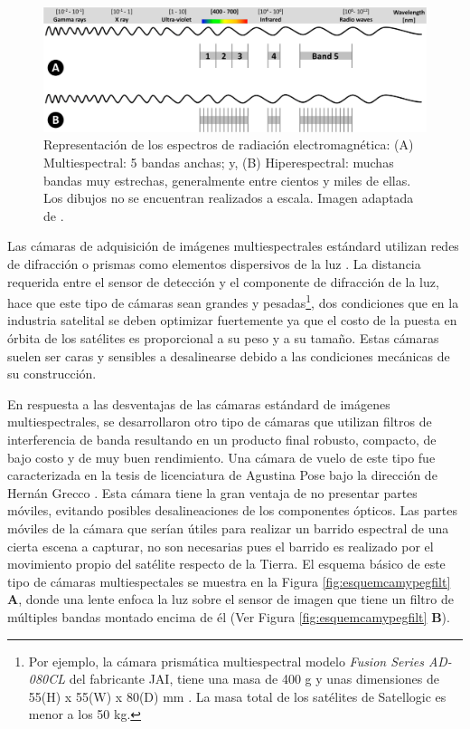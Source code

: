 \begin{figure}[H]
	\centering
	\includegraphics[scale=0.2]{Figs/introduccion/multivshyper.png}
	\caption{ Representación de los espectros de radiación electromagnética: (A) Multiespectral: 5 
		bandas anchas; y, (B) Hiperespectral: muchas bandas muy estrechas, 
		generalmente entre cientos y miles de ellas. Los dibujos no se 
		encuentran 
		realizados a escala. Imagen adaptada de \cite{Adao2017}.}
	\label{fig:spectrus}
\end{figure}


Las cámaras de adquisición de imágenes multiespectrales estándard utilizan 
redes de difracción o prismas como elementos dispersivos de la luz \cite{5459162}. La 
distancia requerida entre el sensor de detección y el componente de difracción 
de la luz, hace que este tipo de cámaras sean grandes y pesadas\footnote{Por ejemplo, la cámara prismática multiespectral modelo \textit{Fusion Series AD-080CL} del fabricante JAI, tiene una masa de 400 g y unas dimensiones de 55(H) x 55(W) x 80(D) mm \cite{jaii}. La masa total de los satélites de Satellogic es menor a los 50 kg.}, dos condiciones que en la industria satelital se deben optimizar 
fuertemente ya que el costo de la puesta en órbita de los satélites es 
proporcional a su peso y a su tamaño. Estas cámaras suelen ser caras y 
sensibles a desalinearse debido a las condiciones mecánicas de su construcción. 

En respuesta a las desventajas de las cámaras estándard de imágenes multiespectrales, se desarrollaron otro tipo de cámaras que utilizan filtros de interferencia de banda resultando en un producto final robusto, compacto, 
de bajo costo y de muy buen rendimiento. Una cámara de vuelo de este tipo fue caracterizada en la tesis de licenciatura de Agustina Pose bajo la dirección de Hernán Grecco \cite{Pose2017}. 
Esta cámara tiene la gran ventaja de no presentar partes móviles, 
evitando posibles desalineaciones de los componentes ópticos. Las partes 
móviles de la cámara que serían útiles para realizar un barrido espectral de 
una cierta escena a capturar, no son necesarias pues el barrido es realizado 
por el movimiento propio del satélite respecto de la Tierra. El esquema básico 
de este tipo de 
cámaras multiespectales se muestra 
en la Figura \ref{fig:esquemcamypegfilt} \textbf{A}, donde una lente enfoca la luz sobre el sensor de imagen que tiene un filtro de múltiples bandas montado encima de él (Ver Figura \ref{fig:esquemcamypegfilt} \textbf{B}).



